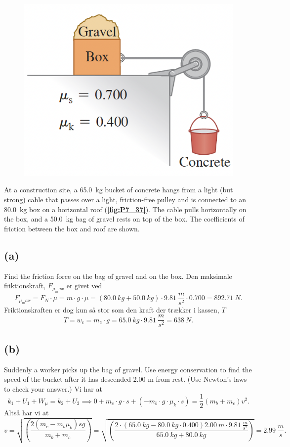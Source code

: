 \documentclass[12pt]{article}
\begin{document}
\begin{figure} [ht]
  \centering
  \caption{}
  \includegraphics[width=0.5\linewidth]{../figures/P7_37.png}
  \label{fig:P7_37}
\end{figure}

At a construction site, a \qty{65,0}{kg} bucket of concrete hangs from a light (but strong) cable that passes over a light, friction-free pulley and is connected to an \qty{80,0}{kg} box on a horizontal roof (\textbf{\autoref{fig:P7_37}}). The cable pulls horizontally on the box, and a \qty{50,0}{kg} bag of gravel rests on top of the box. The coefficients of friction between the box and roof are shown.

\subsection*{(a)}
Find the friction force on the bag of gravel and on the box.
\bigbreak
Den maksimale friktionskraft, $F_{\mu_max}$ er givet ved
\[
  F_{\mu_max} = F_N\cdot \mu = m\cdot g\cdot \mu = (\qty{80,0}{kg} + \qty{50,0}{kg})\cdot \qty{9,81}{\frac{m}{s^2}}\cdot \num{0,700} = \qty{892,71}{N}
.\] 
Friktionskraften er dog kun så stor som den kraft der trækker i kassen, $T$
 \[
T = w_c = m_c \cdot g = \qty{65,0}{kg}\cdot \qty{9,81}{\frac{m}{s^2}} = \qty{638}{N}
.\] 


\subsection*{(b)}
Suddenly a worker picks up the bag of gravel. Use energy conservation to find the speed of the bucket after it has descended 2.00 m from rest. (Use Newton’s laws to check your answer.)
\bigbreak
Vi har at
\[
k_1 + U_1 + W_\mu = k_2 + U_2 \implies 0 + m_c\cdot g\cdot s + (- m_b\cdot g\cdot \mu_k\cdot s) = \frac{1}{2}(m_b + m_c)v^2
.\] 
Altså har vi at
\[
v = \sqrt{\left( \frac{2(m_c - m_b\mu_k)sg}{m_b + m_c} \right) } = \sqrt{\left( \frac{2\cdot (\qty{65,0}{kg} - \qty{80,0}{kg}\cdot \num{0,400})\qty{2,00}{m}\cdot \qty{9,81}{\frac{m}{s^2}}}{\qty{65,0}{kg}+\qty{80,0}{kg}} \right) } = \qty{2,99}{\frac{m}{s}} 
.\] 
\end{document}
